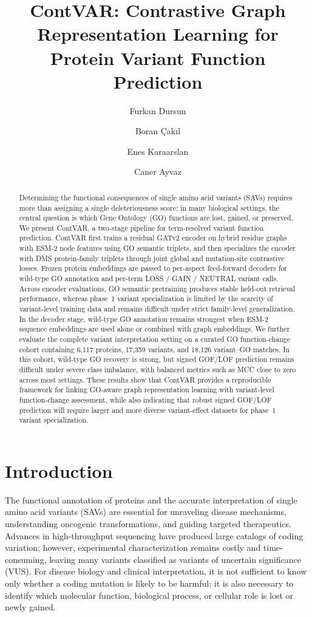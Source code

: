 \documentclass[11pt,a4paper]{article}
\title{ContVAR: Contrastive Graph Representation Learning for Protein Variant Function Prediction}
\author{Furkan Dursun \and Boran \c{C}ak{\i}l \and Enes Karaarslan \and Caner Ayvaz}
\date{}
\begin{document}
\maketitle

\begin{abstract}
Determining the functional consequences of single amino acid variants (SAVs) requires more than assigning a single deleteriousness score: in many biological settings, the central question is which Gene Ontology (GO) functions are lost, gained, or preserved. We present ContVAR, a two-stage pipeline for term-resolved variant function prediction. ContVAR first trains a residual GATv2 encoder on hybrid residue graphs with ESM-2 node features using GO semantic triplets, and then specializes the encoder with DMS protein-family triplets through joint global and mutation-site contrastive losses. Frozen protein embeddings are passed to per-aspect feed-forward decoders for wild-type GO annotation and per-term LOSS / GAIN / NEUTRAL variant calls. Across encoder evaluations, GO semantic pretraining produces stable held-out retrieval performance, whereas phase~1 variant specialization is limited by the scarcity of variant-level training data and remains difficult under strict family-level generalization. In the decoder stage, wild-type GO annotation remains strongest when ESM-2 sequence embeddings are used alone or combined with graph embeddings. We further evaluate the complete variant interpretation setting on a curated GO function-change cohort containing 6,117 proteins, 17,359 variants, and 18,126 variant--GO matches. In this cohort, wild-type GO recovery is strong, but signed GOF/LOF prediction remains difficult under severe class imbalance, with balanced metrics such as MCC close to zero across most settings. These results show that ContVAR provides a reproducible framework for linking GO-aware graph representation learning with variant-level function-change assessment, while also indicating that robust signed GOF/LOF prediction will require larger and more diverse variant-effect datasets for phase~1 variant specialization.
\end{abstract}

\section{Introduction}
The functional annotation of proteins and the accurate interpretation of single amino acid variants (SAVs) are essential for unraveling disease mechanisms, understanding oncogenic transformations, and guiding targeted therapeutics. Advances in high-throughput sequencing have produced large catalogs of coding variation; however, experimental characterization remains costly and time-consuming, leaving many variants classified as variants of uncertain significance (VUS). For disease biology and clinical interpretation, it is not sufficient to know only whether a coding mutation is likely to be harmful; it is also necessary to identify which molecular function, biological process, or cellular role is lost or newly gained.
\end{document}
